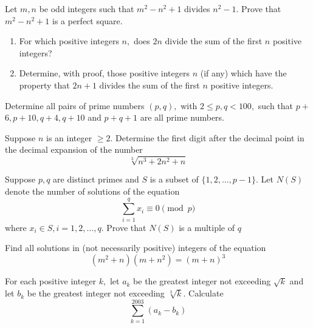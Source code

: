 \documentclass{pset}
\begin{document}
\begin{problems}
\begin{problem}[IrMO 2005 Q10]
    Let \(m, n\) be odd integers such that \(m^{2}-n^{2}+1\) divides \(n^{2}-1 .\) Prove that \(m^{2}-n^{2}+1\)
    is a perfect square.
\end{problem}

\begin{problem}[IrMO 2004 Q1]
    \begin{enumerate}
        \item For which positive integers \(n,\) does \(2 n\) divide the sum of the first \(n\) positive integers?
        \item Determine, with proof, those positive integers \(n\) (if any) which have the property that \(2 n+1\) divides the sum of the first \(n\) positive integers.
    \end{enumerate}
\end{problem}

\begin{problem}[IrMO 2004 Q6]
    Determine all pairs of prime numbers \((p, q),\) with \(2 \leq p, q<100,\) such that \(p+\)
    \(6, p+10, q+4, q+10\) and \(p+q+1\) are all prime numbers.
\end{problem}

\begin{problem}[IrMO 2004 Q8]
    Suppose \(n\) is an integer \(\geq 2 .\) Determine the first digit after the decimal point in the decimal expansion of the number
    $$
    \sqrt[3]{n^{3}+2 n^{2}+n}
    $$
\end{problem}

\begin{problem}[IrMO 2004 Q10]
    Suppose \(p, q\) are distinct primes and \(S\) is a subset of \(\{1,2, \ldots, p-1\} .\) Let \(N(S)\) denote the number of solutions of the equation
    $$
\sum_{i = 1}^{q} x_i \equiv 0 \pmod{p}
    $$
    where \(x_{i} \in S, i=1,2, \ldots, q .\) Prove that \(N(S)\) is a multiple of \(q\)
\end{problem}

\begin{problem}[IrMO 2003 Q1]
    Find all solutions in (not necessarily positive) integers of the equation
    $$
    \left(m^{2}+n\right)\left(m+n^{2}\right)=(m+n)^{3}
    $$
\end{problem}

\begin{problem}[IrMO 2003 Q3]
    For each positive integer \(k,\) let \(a_{k}\) be the greatest integer not exceeding \(\sqrt{k}\) and let \(b_{k}\) be the greatest integer not exceeding \(\sqrt[3]{k} .\) Calculate
    $$
    \sum_{k=1}^{2003}\left(a_{k}-b_{k}\right)
    $$
\end{problem}


\end{problems}
\end{document}
